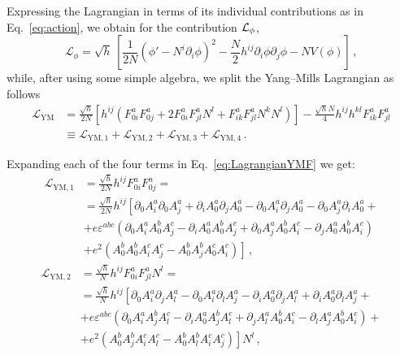 \noindent Expressing the Lagrangian in terms of its individual contributions as in Eq.~\eqref{eq:action}, we obtain for the contribution ${\cal L}_\phi$,
\begin{equation}
\mathcal{L}_{\phi} = \sqrt{h} \, \left[\frac{1}{2 N} \left(\phi' - N^i \partial_i \phi\right)^2 - \frac{N}{2} h^{ij} \partial_i \phi \partial_j \phi - N V(\phi)\right]\,,
\end{equation}
while, after using some simple algebra, we split the Yang--Mills Lagrangian as follows
\begin{align}
\mathcal{L}_{\text{YM}} & = \frac{\sqrt{h}}{2 N} \left[h^{ij} \left(F^a_{0i} F^a_{0j} + 2 F^a_{0i} F^a_{jl} N^l + F^a_{ik} F^a_{jl} N^k N^l\right)\right] - \frac{\sqrt{h} N}{4} h^{ij} h^{kl} F^a_{ik} F^a_{jl}  \nonumber \\
& \equiv \mathcal{L}_{\text{YM},1} + \mathcal{L}_{\text{YM},2} + \mathcal{L}_{\text{YM},3} + \mathcal{L}_{\text{YM},4} \,.
\label{eq:LagrangianYMF}
\end{align}

Expanding each of the four terms in Eq.~\eqref{eq:LagrangianYMF} we get:
\begin{align}
\mathcal{L}_{\text{YM},1} & = \frac{\sqrt{h}}{2 N} h^{ij} F^a_{0i} F^a_{0j} = \nonumber \\
& = \frac{\sqrt{h}}{2 N} h^{ij} \left[\partial_0 A^a_i \partial_0 A^a_j + \partial_i A^a_0 \partial_j A^a_0 - \partial_0 A^a_i \partial_j A^a_0  - \partial_0 A^a_j \partial_i A^a_0 + \right.\nonumber \\
& + e \varepsilon^{abc} \left(\partial_0 A^a_i A^b_0 A^c_j - \partial_i A^a_0 A^b_0 A^c_j + \partial_0 A^a_j A^b_0 A^c_i - \partial_j A^a_0 A^b_0 A^c_i\right) \nonumber \\
& \left.+ e^2 \left(A^b_0 A^b_0 A^c_i A^c_j - A^b_0 A^b_j A^c_0 A^c_i\right)\right] \,,
\end{align}
\begin{align}
\mathcal{L}_{\text{YM},2} & = \frac{\sqrt{h}}{N} h^{ij} F^a_{0i} F^a_{jl} N^l = \nonumber \\
& = \frac{\sqrt{h}}{N} h^{ij} \left[\partial_0 A^a_i \partial_j A^a_l - \partial_0 A^a_i \partial_l A^a_j - \partial_i A^a_0 \partial_j A^a_l + \partial_i A^a_0 \partial_l A^a_j +\right. \nonumber \\
& + e \varepsilon^{abc} \left(\partial_0 A^a_i A^b_j A^c_l - \partial_i A^a_0 A^b_j A^c_l + \partial_j A^a_l A^b_0 A^c_i - \partial_l A^a_j A^b_0 A^c_i\right) + \nonumber \\
& \left. + e^2 \left(A^b_0 A^b_j A^c_i A^c_l - A^b_0 A^b_l A^c_i A^c_j\right)\right] N^l \,,
\end{align}

